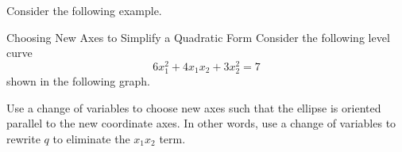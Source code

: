 Consider the following example. 

\begin{example}{Choosing New Axes to Simplify a Quadratic Form}\label{exa:newaxes1}
Consider the following level curve
\[
6x_1^2 + 4x_1x_2 + 3x_2^2 = 7
\]
shown in the following graph. 
\begin{center}
\end{center}

Use a change of variables to choose new axes such that the ellipse is oriented parallel to the new coordinate axes. In other words, use a change of variables to rewrite $q$ to eliminate the $x_1x_2$ term. 
\end{example}

